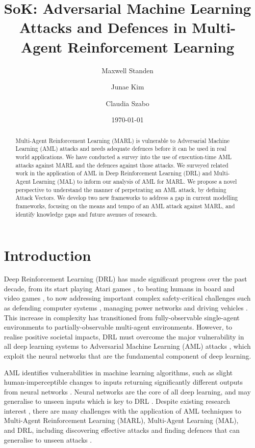 \documentclass[conference,compsoc]{IEEEtran}
\title{SoK: Adversarial Machine Learning Attacks and Defences in Multi-Agent Reinforcement Learning}
\author[1,2]{Maxwell Standen}
\author[1]{Junae Kim}
\author[2]{Claudia Szabo}
\affil[1]{Defence Science and Technology Group}
\affil[2]{The University of Adelaide}
\date{\today}
\begin{document}
\maketitle

\begin{abstract}
    Multi-Agent Reinforcement Learning (MARL) is vulnerable to Adversarial Machine Learning (AML) attacks and needs adequate defences before it can be used in real world applications. 
    We have conducted a survey into the use of execution-time AML attacks against MARL and the defences against those attacks. We surveyed related work in the application of AML in Deep Reinforcement Learning (DRL) and Multi-Agent Learning (MAL) to inform our analysis of AML for MARL.
    We propose a novel perspective to understand the manner of perpetrating an AML attack, by defining Attack Vectors.
    We develop two new frameworks to address a gap in current modelling frameworks, focusing on the means and tempo of an AML attack against MARL, and identify knowledge gaps and future avenues of research.
\end{abstract}



\section{Introduction}
Deep Reinforcement Learning (DRL) has made significant progress over the past decade, from its start playing Atari games \cite{mnih_playing_2013}, to beating humans in board \cite{silver_mastering_2016} and video games \cite{openai_dota_2019, vinyals_grandmaster_2019}, to now addressing important complex safety-critical challenges such as defending computer systems \cite{standen_cyborg_2021}, managing power networks \cite{marot_l2rpn_2020} and driving vehicles \cite{perez-gil_deep_2022}. This increase in complexity has transitioned from fully-observable single-agent environments to partially-observable multi-agent environments. However, to realise positive societal impacts, DRL must overcome the major vulnerability in all deep learning systems to Adversarial Machine Learning (AML) attacks \cite{szegedy_intriguing_2014}, which exploit the neural networks that are the fundamental component of deep learning. 

AML identifies vulnerabilities in machine learning algorithms, such as slight human-imperceptible changes to inputs returning significantly different outputs from neural networks \cite{szegedy_intriguing_2014}. Neural networks are the core of all deep learning, and may generalise to unseen inputs which is key to DRL \cite{mnih_playing_2013}. Despite existing research interest \cite{ilahi_challenges_2021}, there are many challenges with the application of AML techniques to Multi-Agent Reinforcement Learning (MARL), Multi-Agent Learning (MAL), and DRL, including discovering effective attacks \cite{lin_tactics_2017,huang_adversarial_2017,sun_stealthy_2020, qiaoben_strategically-timed_2021} and finding defences that can generalise to unseen attacks \cite{kos_delving_2017,bai_recent_2021}.
\end{document}

